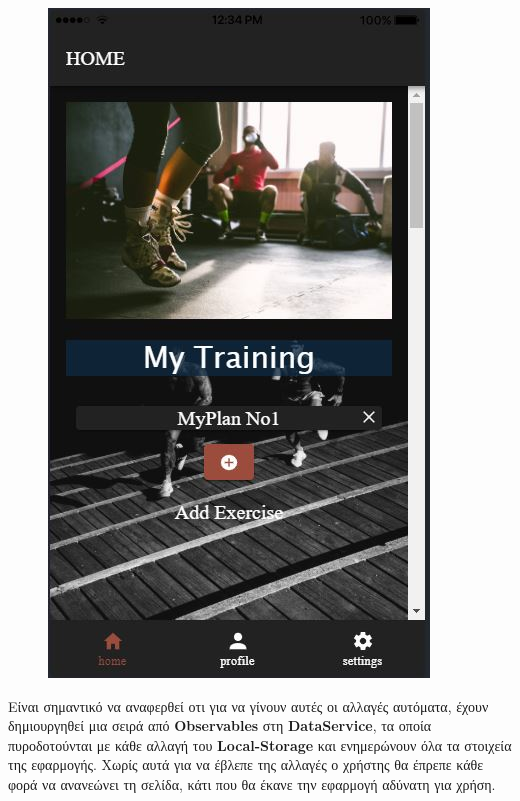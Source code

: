 \documentclass[a4paper,12pt]{article}
\begin{document}
\begin{figure}[!htb]
				\endminipage\hfill
				  \includegraphics[width=\linewidth]{plan6}
				\endminipage\hfill

			\end{figure}
			\vspace*{1cm}
			Είναι σημαντικό να αναφερθεί οτι για να γίνουν αυτές οι αλλαγές αυτόματα, έχουν δημιουργηθεί μια σειρά από 
			\textbf{Observables} στη \textbf{DataService}, τα οποία πυροδοτούνται με κάθε αλλαγή του \textbf{Local-Storage} και ενημερώνουν όλα τα στοιχεία της εφαρμογής. 
			Χωρίς αυτά για να έβλεπε της αλλαγές ο χρήστης θα έπρεπε κάθε φορά να ανανεώνει τη σελίδα, κάτι που θα έκανε 
			την εφαρμογή αδύνατη για χρήση.
\end{document}
